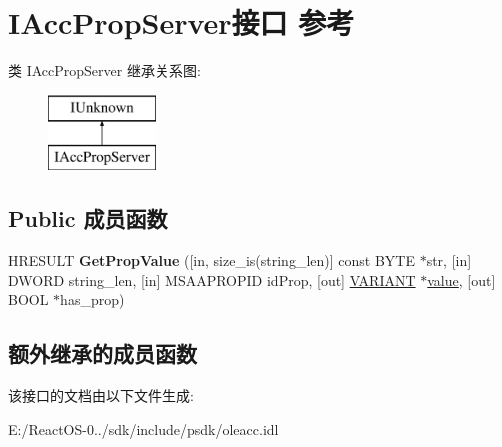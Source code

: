 \hypertarget{interface_i_acc_prop_server}{}\section{I\+Acc\+Prop\+Server接口 参考}
\label{interface_i_acc_prop_server}
类 I\+Acc\+Prop\+Server 继承关系图\+:\begin{figure}[H]
\begin{center}
\leavevmode
\includegraphics[height=2.000000cm]{interface_i_acc_prop_server}
\end{center}
\end{figure}
\subsection*{Public 成员函数}
\begin{DoxyCompactItemize}
\item 
\mbox{\label{interface_i_acc_prop_server_a611f4fa0d4986844c302248084d37109}} 
H\+R\+E\+S\+U\+LT {\bfseries Get\+Prop\+Value} (\mbox{[}in, size\+\_\+is(string\+\_\+len)\mbox{]} const B\+Y\+TE $\ast$str, \mbox{[}in\mbox{]} D\+W\+O\+RD string\+\_\+len, \mbox{[}in\mbox{]} M\+S\+A\+A\+P\+R\+O\+P\+ID id\+Prop, \mbox{[}out\mbox{]} \hyperlink{structtag_v_a_r_i_a_n_t}{V\+A\+R\+I\+A\+NT} $\ast$\hyperlink{unionvalue}{value}, \mbox{[}out\mbox{]} B\+O\+OL $\ast$has\+\_\+prop)
\end{DoxyCompactItemize}
\subsection*{额外继承的成员函数}


该接口的文档由以下文件生成\+:\begin{DoxyCompactItemize}
\item 
E\+:/\+React\+O\+S-\/0../sdk/include/psdk/oleacc.\+idl\end{DoxyCompactItemize}
